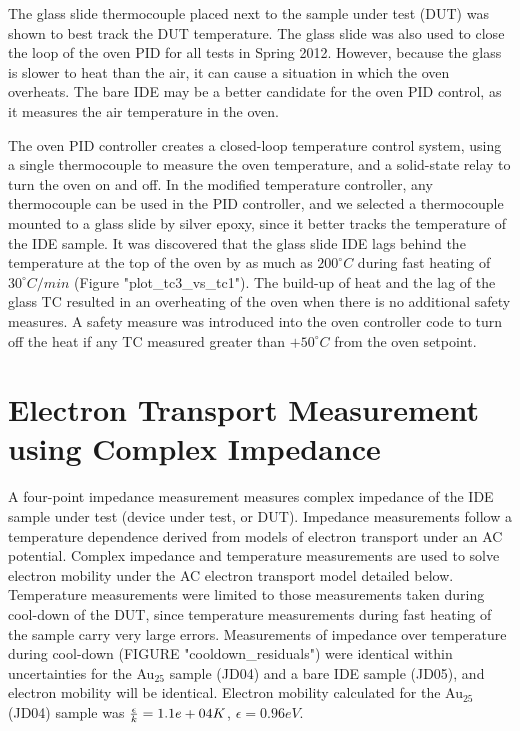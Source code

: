 \documentclass[12pt,oneside,english]{article}
\begin{document}
	The glass slide thermocouple placed next to the sample under test (DUT) was shown to best track the DUT temperature.  The glass slide was also used to close the loop of the oven PID for all tests in Spring 2012.  However, because the glass is slower to heat than the air, it can cause a situation in which the oven overheats.  The bare IDE may be a better candidate for the oven PID control, as it measures the air temperature in the oven.  
	
	The oven PID controller creates a closed-loop temperature control system, using a single thermocouple to measure the oven temperature, and a solid-state relay to turn the oven on and off. 
	In the modified temperature controller, any thermocouple can be used in the PID controller, and we selected a thermocouple mounted to a glass slide by silver epoxy, since it better tracks the temperature of the IDE sample.
	It was discovered that the glass slide IDE lags behind the temperature at the top of the oven by as much as $200^{\circ}C$ during fast heating of $30^{\circ}C/min$ (Figure "plot_tc3_vs_tc1").  The build-up of heat and the lag of the glass TC resulted in an overheating of the oven when there is no additional safety measures.  A safety measure was introduced into the oven controller code to turn off the heat if any TC measured greater than $+50^{\circ}C$ from the oven setpoint.
	
	
	
	
	
	\section{Electron Transport Measurement using Complex Impedance}
	A four-point impedance measurement measures complex impedance of the IDE sample under test (device under test, or DUT).  Impedance measurements follow a temperature dependence derived from models of electron transport under an AC potential.  Complex impedance and temperature measurements are used to solve electron mobility under the AC electron transport model detailed below.  Temperature measurements were limited to those measurements taken during cool-down of the DUT, since temperature measurements during fast heating of the sample carry very large errors.  Measurements of impedance over temperature during cool-down (FIGURE "cooldown_residuals") were identical within uncertainties for the Au$_25$ sample (JD04) and a bare IDE sample (JD05), and electron mobility will be identical.  Electron mobility calculated for the Au$_25$ (JD04) sample was ${\epsilon\over{k}} = 1.1e+04 K$, $\epsilon = 0.96 eV$.
		
\end{document}
